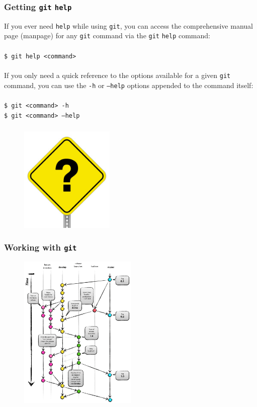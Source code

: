 \documentclass{beamer}
\begin{document}
\begin{frame}
   \frametitle{Getting \texttt{git} \texttt{help}}
   If you ever need \texttt{help} while using \texttt{git}, you can 
   access the comprehensive manual page (manpage) for any \texttt{git} 
   command via the \texttt{git} \texttt{help} command:
   \\ \ \\
   \texttt{\hspace{1.0em}\$ git help <command>}
   \\ \ \\
   If you only need a quick reference to the options available for a 
   given \texttt{git} command, you can use the \texttt{-h} or 
   \texttt{--help} options appended to the command itself:
   \\ \ \\
   \texttt{\hspace{1.0em}\$ git <command> -h} \\
   \texttt{\hspace{1.0em}\$ git <command> --help}
\end{frame}

\begin{frame}
   \frametitle{}
   \vspace{-1.0em}
   \begin{figure}[htbp]
      \includegraphics[width=0.4\textwidth]{images/question-mark-sign.jpg}
   \end{figure}
\end{frame}

\begin{frame}
   \frametitle{Working with \texttt{git}}
   \begin{figure}[htbp]
      \includegraphics[width=0.5\textwidth]{images/gitflow-model.png}
   \end{figure}
\end{frame}
\end{document}
